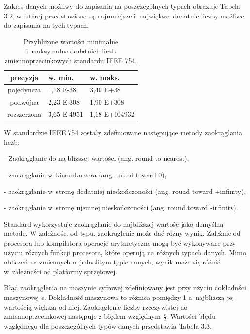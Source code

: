 Zakres danych możliwy do zapisania na poszczególnych typach obrazuje Tabela 3.2, w~której przedstawione są najmniejsze i~największe dodatnie liczby możliwe do zapisania na tych typach.

\begin{table}[H]
        \centering
        \begin{threeparttable}
                \caption{Przybliżone wartości minimalne i~maksymalne dodatnich liczb zmiennoprzecinkowych standardu IEEE 754.}\label{tab:table_exampleazd}
                \begin{tabularx}{0.6\textwidth}{| c | X | X |}
                        \midrule
                        	precyzja	&	w. min. & w. maks. \\
\midrule
		pojedyncza  & 1,18 E-38 & 3,40 E+38 \\
                        podwójna  & 2,23 E-308 & 1,90 E+308 \\
		rozszerzona &  3,65 E-4951 & 1,18 E+104932 \\
                        \bottomrule
                \end{tabularx}
        \end{threeparttable}
\end{table}

W standardzie IEEE 754 zostały zdefiniowane następujące metody zaokrąglania liczb:

- Zaokrąglanie do najbliższej wartości (ang. round to nearest),

- zaokrąglanie w~kierunku zera (ang. round toward 0),

- zaokrąglanie w~stronę dodatniej nieskończoności (ang. round toward +infinity),

- zaokrąglanie w~stronę ujemnej nieskończoności (ang. round toward -infinity).

Standard wykorzystuje zaokrąglanie do najbliższej wartośc jako domyślną metodę. W zależności od typu, zaokrąglenie może dać różny wynik. Zależnie od procesora lub kompilatora operacje arytmetyczne mogą być wykonywane przy użyciu różnych funkcji procesora, które operują na różnych typach danych. Mimo obliczeń na zmiennych o~jednolitym typie danych, wynik może się różnić w~zależności od platformy sprzętowej.

Błąd zaokrąglenia na maszynie cyfrowej zdefiniowany jest przy użyciu dokładnści maszynowej $\epsilon$. Dokładność maszynowa to różnica pomiędzy 1 a~najbliższą jej wartością większą od niej. Zaokrąglenie liczby rzeczywistej do zmiennoprzecinkowej następuje z błędem względnym $\frac{\epsilon}{2}$. Wartości błędu względnego dla poszczególnych typów danych przedstawia Tabela 3.3. 


